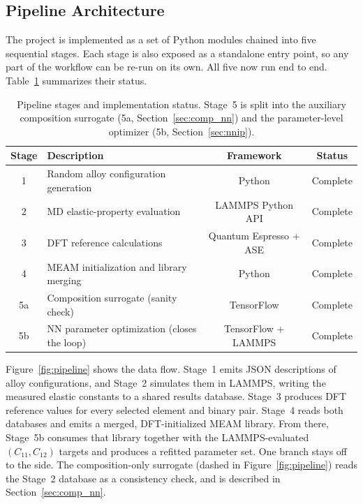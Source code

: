 \projectprogress
\label{sec:progress}

\subsection{Pipeline Architecture}
The project is implemented as a set of Python modules chained into five
sequential stages. Each stage is also exposed as a standalone entry point, so
any part of the workflow can be re-run on its own. All five now run end to end.
Table~\ref{tab:pipeline_status} summarizes their status.

\begin{table}[htbp]
	\centering
	\caption{Pipeline stages and implementation status. Stage~5 is split into
	the auxiliary composition surrogate (5a, Section~\ref{sec:comp_nn}) and
	the parameter-level optimizer (5b, Section~\ref{sec:nnip}).}
	\label{tab:pipeline_status}
	\renewcommand{\arraystretch}{1.2}
	\begin{tabular}{|c|p{6.5cm}|c|c|}
		\hline
		\textbf{Stage} & \textbf{Description} & \textbf{Framework} & \textbf{Status} \\ \hline
		1  & Random alloy configuration generation       & Python                  & Complete \\ \hline
		2  & MD elastic-property evaluation               & LAMMPS Python API       & Complete \\ \hline
		3  & DFT reference calculations                    & Quantum Espresso + ASE  & Complete \\ \hline
		4  & MEAM initialization and library merging       & Python                  & Complete \\ \hline
		5a & Composition surrogate (sanity check)          & TensorFlow              & Complete \\ \hline
		5b & NN parameter optimization (closes the loop)   & TensorFlow + LAMMPS     & Complete \\ \hline
	\end{tabular}
\end{table}

Figure~\ref{fig:pipeline} shows the data flow. Stage~1 emits JSON
descriptions of alloy configurations, and Stage~2 simulates them in LAMMPS,
writing the measured elastic constants to a shared results database. Stage~3
produces DFT reference values for every selected element and binary pair.
Stage~4 reads both databases and emits a merged, DFT-initialized MEAM library.
From there, Stage~5b consumes that library together with the LAMMPS-evaluated
$(C_{11},C_{12})$ targets and produces a refitted parameter set. One branch
stays off to the side. The composition-only surrogate (dashed in
Figure~\ref{fig:pipeline}) reads the Stage~2 database as a consistency check,
and is described in Section~\ref{sec:comp_nn}.

